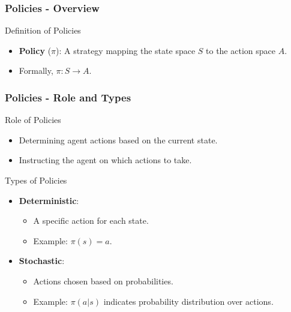 \documentclass[aspectratio=169]{beamer}
\begin{document}
\begin{frame}[fragile]
    \frametitle{Policies - Overview}
    \begin{block}{Definition of Policies}
        \begin{itemize}
            \item \textbf{Policy} ($\pi$): A strategy mapping the state space $S$ to the action space $A$.
            \item Formally, $\pi: S \rightarrow A$.
        \end{itemize}
    \end{block}
\end{frame}

\begin{frame}[fragile]
    \frametitle{Policies - Role and Types}
    \begin{block}{Role of Policies}
        \begin{itemize}
            \item Determining agent actions based on the current state.
            \item Instructing the agent on which actions to take.
        \end{itemize}
    \end{block}

    \begin{block}{Types of Policies}
        \begin{itemize}
            \item \textbf{Deterministic}: 
            \begin{itemize}
                \item A specific action for each state. 
                \item Example: $\pi(s) = a$.
            \end{itemize}
            \item \textbf{Stochastic}:
            \begin{itemize}
                \item Actions chosen based on probabilities.
                \item Example: $\pi(a|s)$ indicates probability distribution over actions.
            \end{itemize}
        \end{itemize}
    \end{block}
\end{frame}
\end{document}
